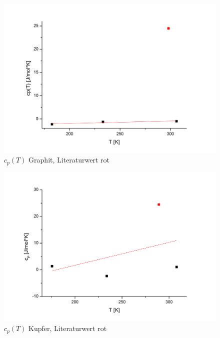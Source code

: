 \documentclass[12pt,a4paper,titlepage,headinclude,bibtotoc]{scrartcl}
\begin{document}
\begin{figure} [h!]
\begin{center}
\includegraphics[scale=0.5]{cp(T)GraphitNeu.png} \end{center}
\caption{$c_p(T)$ Graphit, Literaturwert rot}
\end{figure} 
\FloatBarrier

\begin{figure} [h!]
\begin{center}
\includegraphics[scale=0.5]{cp(T)KupferNeu.png} \end{center}
\caption{$c_p(T)$ Kupfer, Literaturwert rot}
\end{figure} 
\FloatBarrier  
\end{document}

